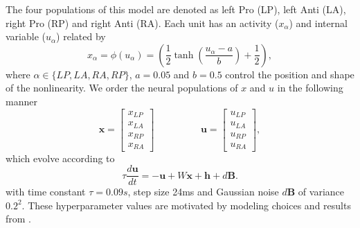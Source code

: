 \documentclass[11pt]{article}
\begin{document}
The four populations of this model are denoted as left Pro (LP), left Anti (LA), right Pro (RP) and right Anti (RA).  
Each unit has an activity ($x_\alpha$) and internal variable ($u_\alpha$) related by
\begin{equation}
x_\alpha = \phi(u_\alpha) = \left(\frac{1}{2}\tanh\left(\frac{u_\alpha - a}{b}\right)+ \frac{1}{2} \right),
\end{equation}
where $\alpha \in \{LP, LA, RA, RP\}$, $a = 0.05$ and $b = 0.5$ control the position and shape of the nonlinearity.
We order the neural populations of $x$ and $u$ in the following manner
\begin{equation}
\mathbf{x} = \begin{bmatrix} x_{LP} \\ x_{LA} \\ x_{RP} \\ x_{RA} \end{bmatrix} \hspace{2cm} \mathbf{u} = \begin{bmatrix} u_{LP} \\ u_{LA} \\ u_{RP} \\ u_{RA} \end{bmatrix},
\end{equation}
which evolve according to
\begin{equation}
\tau \frac{d\mathbf{u}}{dt} = -\mathbf{u} + W\mathbf{x} + \mathbf{h} + d\mathbf{B}.
\end{equation}
with time constant $\tau = 0.09s$, step size 24ms and Gaussian noise $d\mathbf{B}$ of variance $0.2^2$.
These hyperparameter values are motivated by modeling choices and results from \cite{duan2018collicular}.
\end{document}
